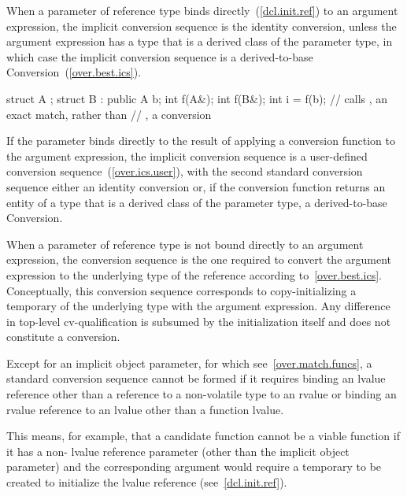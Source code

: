 \pnum
When a parameter of reference type binds directly~(\ref{dcl.init.ref}) to an
argument expression, the implicit conversion sequence is the identity conversion,
unless the argument expression has a type that is a derived class of the parameter
type, in which case the implicit conversion sequence is a derived-to-base
Conversion~(\ref{over.best.ics}).
\begin{example}

\begin{codeblock}
struct A {};
struct B : public A {} b;
int f(A&);
int f(B&);
int i = f(b);                   // calls , an exact match, rather than
                                // , a conversion
\end{codeblock}
\end{example}
If the parameter binds directly to the result of
applying a conversion function to the argument expression, the implicit
conversion sequence is a user-defined conversion sequence~(\ref{over.ics.user}),
with the second standard conversion sequence either an identity conversion or,
if the conversion function returns an entity of a type that is a derived class
of the parameter type, a derived-to-base Conversion.

\pnum
When a parameter of reference type is not bound directly to an argument
expression, the conversion sequence is the one required to convert the argument
expression to the underlying type of the reference according to~\ref{over.best.ics}.
Conceptually, this conversion sequence corresponds to copy-initializing a
temporary of the underlying type with the argument expression.
Any difference
in top-level cv-qualification is subsumed by the initialization itself and
does not constitute a conversion.

\pnum
Except for an implicit object parameter, for which see~\ref{over.match.funcs}, a
standard conversion sequence cannot be formed if it requires
binding an lvalue reference
other than a reference to a non-volatile  type
to an rvalue
or binding an rvalue reference to an lvalue other than a function lvalue.
\begin{note}
This means, for example, that a candidate function cannot be a viable
function if it has a non- lvalue reference parameter (other than
the implicit object parameter) and the corresponding argument
would require a temporary to be created to initialize the lvalue
reference (see~\ref{dcl.init.ref}).
\end{note}

